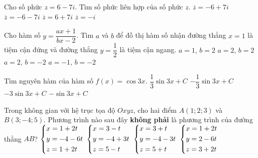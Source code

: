 \begin{ex}%
	Cho số phức $ z=6-7i $. Tìm số phức liên hợp của số phức $ z $.
	\choice
	{$ \overline{z}=-6+7i $}
	{$ \overline{z}=-6-7i $}
	{\True $ \overline{z}=6+7i $}
	{$ \overline{z}=-i $}
\end{ex}
\begin{ex}%
	Cho hàm số $ y=\dfrac{ax+1}{bx-2} $. Tìm $ a $ và $ b $ để đồ thị hàm số nhận đường thẳng $ x=1 $ là tiệm cận đứng và đường thẳng $ y=\dfrac{1}{2} $ là tiệm cận ngang.
	\choice
	{\True $ a=1 $, $ b=2 $}
	{$ a=2 $, $ b=2 $}
	{$ a=2 $, $ b=-2 $}
	{$ a=-1 $, $ b=-2 $}
\end{ex}
\begin{ex}%
	Tìm nguyên hàm của hàm số $ f(x)=\cos 3x $.
	\choice
	{\True $ \dfrac{1}{3}\sin 3x+C $}
	{$ -\dfrac{1}{3}\sin 3x+C $}
	{$ -3\sin 3x+C $}
	{$ -\sin 3x+C $}
\end{ex}
\begin{ex}%
	Trong không gian với hệ trục tọa độ $ Oxyz $, cho hai điểm $ A(1;2;3) $ và $ B(3;-4;5) $. Phương trình nào sau đây \textbf{không phải} là phương trình của đường thẳng $ AB $?
	\choice
	{\True $ \left\{\begin{aligned}&x=1+2t\\ &y=-4-6t\\ &z=1+2t\end{aligned}\right. $}
	{$ \left\{\begin{aligned}&x=3-t\\ &y=-4+3t\\ &z=5-t\end{aligned}\right. $}
	{$ \left\{\begin{aligned}&x=3+t\\ &y=-4-3t\\ &z=5+t\end{aligned}\right. $}
	{$ \left\{\begin{aligned}&x=1+2t\\ &y=2-6t\\ &z=3+2t\end{aligned}\right. $}
\end{ex}
